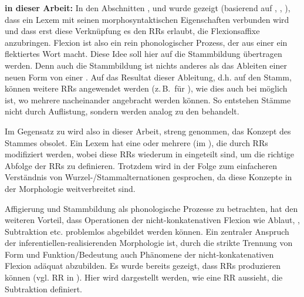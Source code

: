 \begin{exe}
\begin{exe}
\noindent
\textbf{ in dieser Arbeit:} In den Abschnitten  ,  und  wurde gezeigt (basierend auf \citealt{Anderson1992}, \citealt{Stump2001}, \citealt{AckermanStump2004}), dass ein Lexem mit seinen morphosyntaktischen Eigenschaften verbunden wird und dass erst diese Verknüpfung es den RRs erlaubt, die Flexionsaffixe anzubringen. Flexion ist also ein rein phonologischer Prozess, der aus einer  ein flektiertes Wort macht. Diese Idee soll hier auf die Stammbildung übertragen werden. Denn auch die Stammbildung ist nichts anderes als das Ableiten einer neuen Form von einer . Auf das Resultat dieser Ableitung, d.h. auf den Stamm, können weitere RRs angewendet werden (z.\,B.\ für ), wie dies auch bei  möglich ist, wo mehrere  nacheinander angebracht werden können. So entstehen Stämme nicht durch Auflistung, sondern werden analog zu den  behandelt.\largerpage

Im Gegensatz zu \citet{Stump2001} wird also in dieser Arbeit, streng genommen, das Konzept des Stammes obsolet. Ein Lexem hat eine oder mehrere  (im ), die durch RRs modifiziert werden, wobei diese RRs wiederum in  eingeteilt sind, um die richtige Abfolge der RRs zu definieren. Trotzdem wird in der Folge zum einfacheren Verständnis von Wur\-zel-/Stamm\-al\-ter\-na\-tio\-nen gesprochen, da diese Konzepte in der Morphologie weitverbreitet sind.

Affigierung und Stammbildung als phonologische Prozesse zu betrachten, hat den weiteren Vorteil, dass Operationen der nicht-konkatenativen Flexion wie Ablaut, , Subtraktion etc. problemlos abgebildet werden können. Ein zentraler Anspruch der in\-fe\-ren\-tiel\-len-re\-a\-li\-sie\-ren\-den Morphologie ist, durch die strikte Trennung von Form und Funktion/Bedeutung auch Phänomene der nicht-konkatenativen Flexion adäquat abzubilden. Es wurde bereits gezeigt, dass RRs  produzieren können (vgl. RR in ). Hier wird dargestellt werden, wie eine RR aussieht, die Subtraktion definiert.


\end{exe}
\end{exe}
